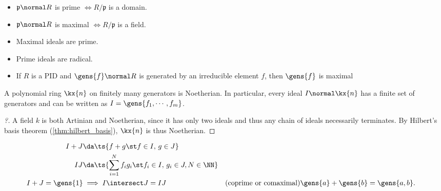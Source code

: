 \begin{fact}

\envlist

\begin{itemize}
\tightlist
\item
  \(\mathfrak{p}\normal R\) is prime \(\iff R/\mathfrak{p}\) is a
  domain.
\item
  \(\mathfrak{p}\normal R\) is maximal \(\iff R/\mathfrak{p}\) is a
  field.
\item
  Maximal ideals are prime.
\item
  Prime ideals are radical.
\item
  If \(R\) is a PID and \(\gens{f} \normal R\) is generated by an
  irreducible element \(f\), then \(\gens{f}\) is maximal
\end{itemize}

\end{fact}

\begin{proposition}

A polynomial ring \(\kx{n}\) on finitely many generators is Noetherian.
In particular, every ideal \(I\normal \kx{n}\) has a finite set of
generators and can be written as \(I = \gens{f_1, \cdots, f_m}\).

\end{proposition}

\begin{proof}[?]

A field \(k\) is both Artinian and Noetherian, since it has only two
ideals and thus any chain of ideals necessarily terminates. By Hilbert's
basis theorem (\cref{thm:hilbert_basis}), \(\kx{n}\) is thus Noetherian.

\end{proof}

\begin{proposition}

\begin{align*}  
I+J   &\da \ts{f+g \st f\in I,\, g\in J} \\
IJ    &\da \ts{\sum_{i=1}^N f_i g_i \st f_i\in I,\, g_i\in J, N\in \NN} \\
I+J   = \gens{1} 
      &\implies I\intersect J = IJ && \text{(coprime or comaximal)}
\gens{a} + \gens{b} = \gens{a, b}
.\end{align*}

\end{proposition}

